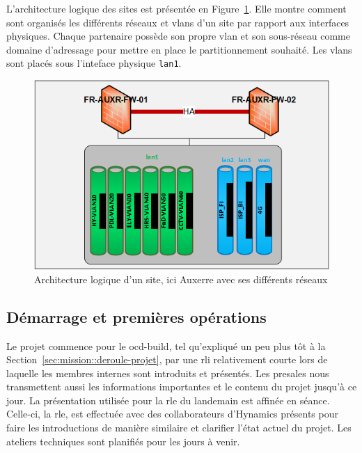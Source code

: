 \documentclass[12pt, oneside, a4paper, titlepage]{report}
\begin{document}
L'architecture logique des sites est présentée en
Figure~\ref{fig:doc-hy/site-logi-arch}. Elle montre comment sont organisés les
différents réseaux et \glspl{vlan} d'un site par rapport aux interfaces
physiques. Chaque partenaire possède son propre \gls{vlan} et son sous-réseau
comme domaine d'adressage pour mettre en place le partitionnement souhaité. Les
\glspl{vlan} sont placés sous l'inteface physique \texttt{lan1}.

\begin{figure}[h!]
    \centering
    \includegraphics[width = 0.8\linewidth]{img/doc-hy/site-logi-arch.png}
    \caption{%
        Architecture logique d'un site, ici Auxerre avec ses différents réseaux%
    }%
    \label{fig:doc-hy/site-logi-arch}
\end{figure}

\subsection{Démarrage et premières opérations}%
\label{sub:mission::main::start}

Le projet commence pour le \gls{ocd-build}, tel qu'expliqué un peu plus tôt à la
Section~\ref{sec:mission::deroule-projet}, par une \acrfull{rli} relativement
courte lors de laquelle les membres internes sont introduits et présentés. Les
\gls{presales} nous transmettent aussi les informations importantes et le
contenu du projet jusqu'à ce jour. La présentation utilisée pour la \gls{rle} du
landemain est affinée en séance. Celle-ci, la \acrfull{rle}, est effectuée avec
des collaborateurs d'Hynamics présents pour faire les introductions de manière
similaire et clarifier l'état actuel du projet. Les ateliers techniques sont
planifiés pour les jours à venir.
\end{document}
